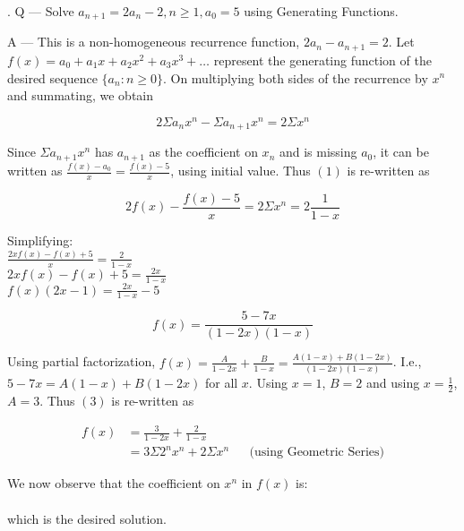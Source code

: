 \documentclass{article}
\newcounter{question}
\begin{document}
\newcommand\Que[1]{%
   \leavevmode\par
   \stepcounter{question}
   \noindent
   \thequestion. Q --- #1\par}

\newcommand\Ans[2][]{%
    \leavevmode\par\noindent
   {\leftskip37pt
    A --- \textbf{#1}#2\par}}

\Que{
    Solve $ a_{n+1}=2a_{n}-2, n\ge1, a_0=5 $
    using Generating Functions.
    }
\Ans{
    This is a non-homogeneous recurrence function,
    $2a_n - a_{n+1} = 2$. 
    Let $f(x) = a_0 + a_1x + a_2x^2 + a_3x^3 + \dots$ 
    represent the generating function of the desired sequence 
    $\{a_n: n\ge{0}\}$. On multiplying both sides
    of the recurrence by $x^n$ and summating, we obtain

    \begin{equation}
        2\Sigma{a_nx^n} 
        - \Sigma{a_{n+1}x^n} 
        = 2\Sigma{x^n}
    \end{equation}
    
    Since $\Sigma{a_{n+1}x^n}$ 
    has $a_{n+1}$ as the coefficient on $x_n$
    and is missing $a_0$, it can be written as
    $\frac{f(x)-a_0}{x} = \frac{f(x)-5}{x}$, 
    using initial value.
    Thus $(1)$ is re-written as
    
    \begin{equation}
        2f(x)-\frac{f(x)-5}{x}
        =2\Sigma{x^n}
        =2\frac{1}{1-x}
    \end{equation}

    Simplifying:\\

    $\frac{2xf(x)-f(x)+5}{x}
    =\frac{2}{1-x}$\\

    $2xf(x)-f(x)+5
    =\frac{2x}{1-x}$\\

    $f(x)(2x-1)
    =\frac{2x}{1-x} - 5$

    \begin{equation}
        f(x)
        =\frac{5-7x}{(1-2x)(1-x)}
    \end{equation}

    Using partial factorization,
    $ f(x) = \frac{A}{1-2x} + \frac{B}{1-x}
     = \frac{A(1-x) + B(1-2x)}{(1-2x)(1-x)}$.
    I.e.,
    $5-7x = A(1-x) + B(1-2x)$ for all $x$.
    Using $x=1$, $B=2$ and using
    $x=\frac{1}{2}$, $A=3$. Thus $(3)$
    is re-written as

    \begin{align*}
        f(x) & = \frac{3}{1-2x} + \frac{2}{1-x}\\
        & = 3\Sigma{2^nx^n} + 2\Sigma{x^n}
        && \text{(using Geometric Series)}
    \end{align*}

    We now observe that the coefficient
    on $x^n$ in $f(x)$ is:\\

    \boxed{
    a_n = 3\cdot{2^n}+2
    }\\

    which is the desired solution.
    }
\end{document}

